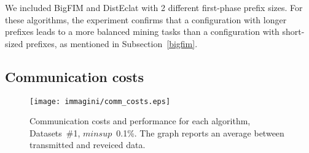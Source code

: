We included BigFIM and DistEclat with 2 different
first-phase prefix sizes.
For these algorithms, the experiment confirms that a configuration with longer prefixes
leads to a more balanced mining tasks than a configuration with short-sized prefixes,
as mentioned in Subsection~\ref{bigfim}.
%





\subsection{Communication costs}
\label{communication_costs}

\begin{figure*}[!t]
\begin{center}
\texttt{[image: immagini/comm\_costs.eps]}
\caption{Communication costs and performance for each algorithm,
Datasets~\#1, $minsup$~0.1\%.
The graph reports an average between transmitted and reveiced data.}
\label{comm_costs}
\end{center}
\end{figure*}

